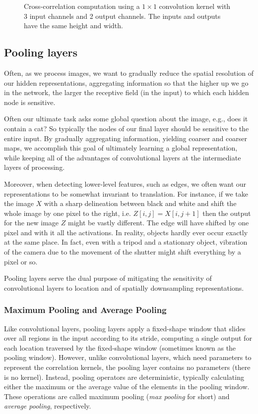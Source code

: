 \begin{figure}[hpt]
	\centering
	
	\caption{Cross-correlation computation using a $1 \times 1$ convolution kernel with 3 input channels and 2 output channels. The inputs and outputs have the same height and width.}
	\label{fig:conv_1x1}
\end{figure}

\subsection{Pooling layers}\label{subsec:pool_layers}

Often, as we process images, we want to gradually reduce the spatial resolution of our hidden representations, aggregating information so that the higher up we go in the network, the larger the receptive field (in the input) to which each hidden node is sensitive.

Often our ultimate task asks some global question about the image, e.g., does it contain a cat? So typically the nodes of our final layer should be sensitive to the entire input. By gradually aggregating information, yielding coarser and coarser maps, we accomplish this goal of ultimately learning a global representation, while keeping all of the advantages of convolutional layers at the intermediate layers of processing.

Moreover, when detecting lower-level features, such as edges, we often want our representations to be somewhat invariant to translation. For instance, if we take the image $X$ with a sharp delineation between black and white and shift the whole image by one pixel to the right, i.e. $Z[i,j] = X[i,j+1]$ then the output for the new image $Z$ might be vastly different. The edge will have shifted by one pixel and with it all the activations. In reality, objects hardly ever occur exactly at the same place. In fact, even with a tripod and a stationary object, vibration of the camera due to the movement of the shutter might shift everything by a pixel or so.

Pooling layers serve the dual purpose of mitigating the sensitivity of convolutional layers to location and of spatially downsampling representations.

\subsubsection{Maximum Pooling and Average Pooling}

Like convolutional layers, pooling layers apply a fixed-shape window that slides over all regions in the input according to its stride, computing a single output for each location traversed by the fixed-shape window (sometimes known as the pooling window). However, unlike convolutional layers, which need parameters to represent the correlation kernels, the pooling layer contains no parameters (there is no kernel). Instead, pooling operators are deterministic, typically calculating either the maximum or the average value of the elements in the pooling window. These operations are called maximum pooling (\textit{max pooling} for short) and \textit{average pooling}, respectively.

